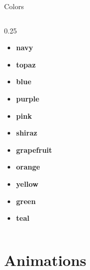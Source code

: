 \documentclass[t, aspectratio=169, english, table]{_style/tudelft-beamer}
\begin{document}
\begin{frame}[t]{Colors}
\begin{columns}[T, onlytextwidth]
\begin{column}{0.25\textwidth}
\begin{itemize}
        \item \textcolor{tud navy}{\textbf{navy}}
        \item \textcolor{tud topaz}{\textbf{topaz}}
        \item \textcolor{tud blue}{\textbf{blue}}
        \item \textcolor{tud purple}{\textbf{purple}}
        \item \textcolor{tud pink}{\textbf{pink}}
        \item \textcolor{tud shiraz}{\textbf{shiraz}}
        \item \textcolor{tud grapefruit}{\textbf{grapefruit}}
        \item \textcolor{tud orange}{\textbf{orange}}
        \item \textcolor{tud yellow}{\textbf{yellow}}
        \item \textcolor{tud green}{\textbf{green}}
        \item \textcolor{tud teal}{\textbf{teal}}
      \end{itemize}
    \end{column}
  \end{columns}
\end{frame}


\section{Animations}
\setlength{\splitpos}{0pt}
\rightfooterwhitefalse
\end{document}
